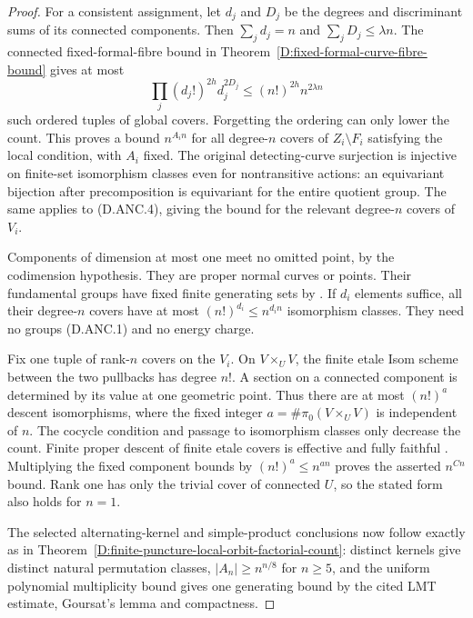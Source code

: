 \begin{proof}
For a consistent assignment, let $d_j$ and $D_j$ be the degrees
and discriminant sums of its connected components. Then
$\sum_jd_j=n$ and $\sum_jD_j\le\lambda n$. The connected
fixed-formal-fibre bound in
Theorem~\ref{D:fixed-formal-curve-fibre-bound} gives at most
\[
 \prod_j(d_j!)^{2h}d_j^{2D_j}
                  \le (n!)^{2h}n^{2\lambda n}             \tag{D.ANC.5}
\]
such ordered tuples of global covers. Forgetting the ordering
can only lower the count. This proves a bound $n^{A_i n}$ for
all degree-$n$ covers of $Z_i\setminus F_i$ satisfying the local
condition, with $A_i$ fixed. The original detecting-curve
surjection is injective on finite-set isomorphism classes even
for nontransitive actions: an equivariant bijection after
precomposition is equivariant for the entire quotient group.
The same applies to (D.ANC.4), giving the bound for the relevant
degree-$n$ covers of $V_i$.

Components of dimension at most one meet no omitted point, by
the codimension hypothesis. They are proper normal curves or
points. Their fundamental groups have fixed finite generating
sets by \citet[Expose~X, Theorem~2.6, pp.~272--273]{C_SGA1}.
If $d_i$ elements suffice, all their degree-$n$ covers have at
most $(n!)^{d_i}\le n^{d_i n}$ isomorphism classes. They need
no groups (D.ANC.1) and no energy charge.

Fix one tuple of rank-$n$ covers on the $V_i$. On
$V\times_U V$, the finite etale Isom scheme between the two
pullbacks has degree $n!$. A section on a connected component
is determined by its value at one geometric point. Thus there
are at most $(n!)^a$ descent isomorphisms, where the fixed integer
$a=\#\pi_0(V\times_U V)$ is independent of $n$. The cocycle
condition and passage to isomorphism classes only decrease the
count. Finite proper descent of finite etale covers is effective
and fully faithful
\citep[Expose~IX, Theorem~4.7]{C_SGA1}. Multiplying the fixed
component bounds by $(n!)^a\le n^{a n}$ proves the asserted
$n^{Cn}$ bound. Rank one has only the trivial cover of connected
$U$, so the stated form also holds for $n=1$.

The selected alternating-kernel and simple-product conclusions
now follow exactly as in
Theorem~\ref{D:finite-puncture-local-orbit-factorial-count}:
distinct kernels give distinct natural permutation classes,
$|A_n|\ge n^{n/8}$ for $n\ge5$, and the uniform polynomial
multiplicity bound gives one generating bound by the cited
LMT estimate, Goursat's lemma and compactness.


\end{proof}
